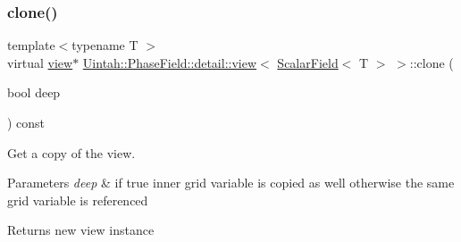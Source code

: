 \subsubsection{\texorpdfstring{clone()}{clone()}\hspace{0.1cm}{\footnotesize\ttfamily [1/2]}}
{\footnotesize\ttfamily template$<$typename T $>$ \\
virtual \hyperlink{classUintah_1_1PhaseField_1_1detail_1_1view}{view}$\ast$ \hyperlink{classUintah_1_1PhaseField_1_1detail_1_1view}{Uintah\+::\+Phase\+Field\+::detail\+::view}$<$ \hyperlink{structUintah_1_1PhaseField_1_1ScalarField}{Scalar\+Field}$<$ T $>$ $>$\+::clone (\begin{DoxyParamCaption}\item[{bool}]{deep }\end{DoxyParamCaption}) const\hspace{0.3cm}{\ttfamily [pure virtual]}}



Get a copy of the view. 


\begin{DoxyParams}{Parameters}
{\em deep} & if true inner grid variable is copied as well otherwise the same grid variable is referenced\\
\hline
\end{DoxyParams}
\begin{DoxyReturn}{Returns}
new view instance 
\end{DoxyReturn}


